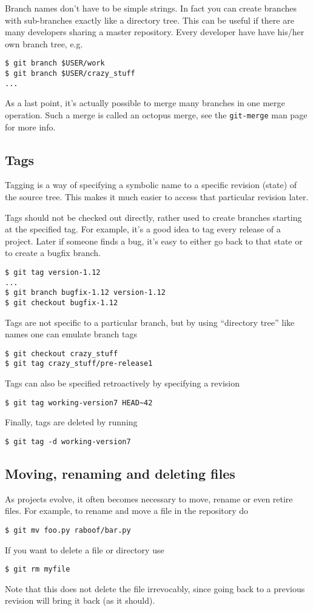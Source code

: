 \documentclass[a4paper,10pt]{article}
\begin{document}
Branch names don't have to be simple strings. In fact you can create branches
with sub-branches exactly like a directory tree. This can be useful if there
are many developers sharing a master repository. Every developer have have
his/her own branch tree, e.g.
\begin{verbatim}
$ git branch $USER/work
$ git branch $USER/crazy_stuff
...
\end{verbatim}

As a last point, it's actually possible to merge many branches in one merge
operation.  Such a merge is called an octopus merge, see the
\texttt{git-merge} man page for more info.

\subsection{Tags}
Tagging is a way of specifying a symbolic name to a specific revision (state) 
of the source tree. This makes it much easier to access that particular
revision later. 

Tags should not be checked out directly, rather used to create branches
starting at the specified tag.
For example, it's a good idea to tag every release of a
project. Later if someone finds a bug, it's easy to either go back to that
state or to create a bugfix branch.
\begin{verbatim}
$ git tag version-1.12
...
$ git branch bugfix-1.12 version-1.12
$ git checkout bugfix-1.12
\end{verbatim}
Tags are not specific to a particular branch, but by using
``directory tree'' like names one can emulate branch tags
\begin{verbatim}
$ git checkout crazy_stuff
$ git tag crazy_stuff/pre-release1
\end{verbatim}
Tags can also be specified retroactively by specifying a revision
\begin{verbatim}
$ git tag working-version7 HEAD~42
\end{verbatim}
Finally, tags are deleted by running
\begin{verbatim}
$ git tag -d working-version7 
\end{verbatim}

\subsection{Moving, renaming and deleting files}
As projects evolve, it often becomes necessary to move, rename or even retire 
files. For example, to rename and move a file in the repository do 
\begin{verbatim}
$ git mv foo.py raboof/bar.py
\end{verbatim}
If you want to delete a file or directory use
\begin{verbatim}
$ git rm myfile
\end{verbatim}
Note that this does not delete the file irrevocably, since going back to a
previous revision will bring it back (as it should).
\end{document}
